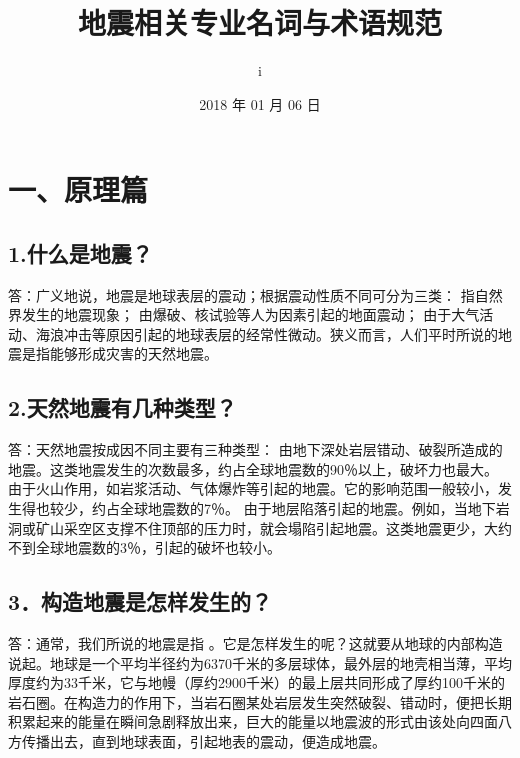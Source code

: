 \documentclass[a4paper,10pt,english]{sphinxmanual}
\title{地震相关专业名词与术语规范}
\date{2018 年 01 月 06 日}
\author{i}
\begin{document}
\maketitle
\sphinxtableofcontents
{}\label{\detokenize{index::doc}}



\chapter{一、原理篇}
\label{\detokenize{index:id1}}\label{\detokenize{index:id2}}

\section{1.什么是地震？}
\label{\detokenize{index:id3}}
答：广义地说，地震是地球表层的震动；根据震动性质不同可分为三类：  指自然界发生的地震现象；   由爆破、核试验等人为因素引起的地面震动； 由于大气活动、海浪冲击等原因引起的地球表层的经常性微动。狭义而言，人们平时所说的地震是指能够形成灾害的天然地震。


\section{2.天然地震有几种类型？}
\label{\detokenize{index:id4}}
答：天然地震按成因不同主要有三种类型：  由地下深处岩层错动、破裂所造成的地震。这类地震发生的次数最多，约占全球地震数的90％以上，破坏力也最大。  由于火山作用，如岩浆活动、气体爆炸等引起的地震。它的影响范围一般较小，发生得也较少，约占全球地震数的7％。  由于地层陷落引起的地震。例如，当地下岩洞或矿山采空区支撑不住顶部的压力时，就会塌陷引起地震。这类地震更少，大约不到全球地震数的3％，引起的破坏也较小。


\section{3．构造地震是怎样发生的？}
\label{\detokenize{index:id5}}
答：通常，我们所说的地震是指  。它是怎样发生的呢？这就要从地球的内部构造说起。地球是一个平均半径约为6370千米的多层球体，最外层的地壳相当薄，平均厚度约为33千米，它与地幔（厚约2900千米）的最上层共同形成了厚约100千米的岩石圈。在构造力的作用下，当岩石圈某处岩层发生突然破裂、错动时，便把长期积累起来的能量在瞬间急剧释放出来，巨大的能量以地震波的形式由该处向四面八方传播出去，直到地球表面，引起地表的震动，便造成地震。
\end{document}
